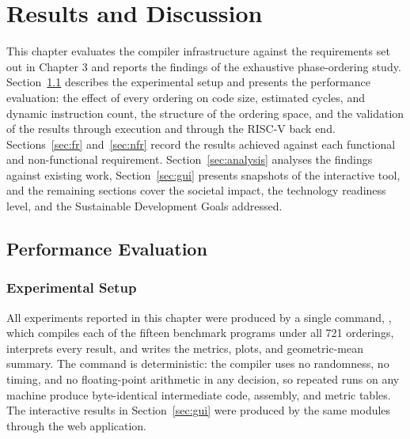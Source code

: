 \chapter{Results and Discussion}

This chapter evaluates the compiler infrastructure against the requirements set out in Chapter 3 and reports the findings of the exhaustive phase-ordering study. Section~\ref{sec:empirical} describes the experimental setup and presents the performance evaluation: the effect of every ordering on code size, estimated cycles, and dynamic instruction count, the structure of the ordering space, and the validation of the results through execution and through the RISC-V back end. Sections~\ref{sec:fr} and~\ref{sec:nfr} record the results achieved against each functional and non-functional requirement. Section~\ref{sec:analysis} analyses the findings against existing work, Section~\ref{sec:gui} presents snapshots of the interactive tool, and the remaining sections cover the societal impact, the technology readiness level, and the Sustainable Development Goals addressed.

\section{Performance Evaluation}
\label{sec:empirical}

\subsection{Experimental Setup}

All experiments reported in this chapter were produced by a single command, , which compiles each of the fifteen benchmark programs under all 721 orderings, interprets every result, and writes the metrics, plots, and geometric-mean summary. The command is deterministic: the compiler uses no randomness, no timing, and no floating-point arithmetic in any decision, so repeated runs on any machine produce byte-identical intermediate code, assembly, and metric tables. The interactive results in Section~\ref{sec:gui} were produced by the same modules through the web application.

